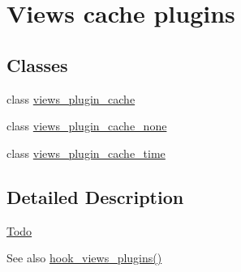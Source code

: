 \hypertarget{group__views__cache__plugins}{
\section{Views cache plugins}
\label{group__views__cache__plugins}
}
\subsection*{Classes}
\begin{DoxyCompactItemize}
\item 
class \hyperlink{classviews__plugin__cache}{views\_\-plugin\_\-cache}
\item 
class \hyperlink{classviews__plugin__cache__none}{views\_\-plugin\_\-cache\_\-none}
\item 
class \hyperlink{classviews__plugin__cache__time}{views\_\-plugin\_\-cache\_\-time}
\end{DoxyCompactItemize}


\subsection{Detailed Description}
\begin{Desc}
\item[\hyperlink{todo__todo000083}{Todo}]\end{Desc}
\begin{DoxySeeAlso}{See also}
\hyperlink{group__views__hooks_ga23f6e9972b2ed84fc54b7ff63f44477d}{hook\_\-views\_\-plugins()} 
\end{DoxySeeAlso}
